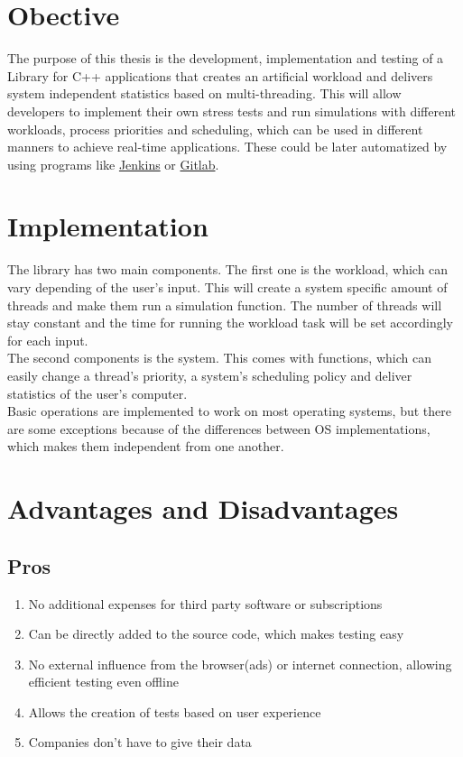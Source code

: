 \section{Obective}
The purpose of this thesis is the development, implementation and testing of a Library for C++ applications that creates an artificial workload and delivers system independent statistics based on multi-threading. This will allow developers to implement their own stress tests and run simulations with different workloads, process priorities and scheduling, which can be used in different manners to achieve real-time applications. These could be later automatized by using programs like \href{https://www.jenkins.io/}{Jenkins}\cite{Jenkins} or \href{https://about.gitlab.com/}{Gitlab}\cite{GitLab}.

\section{Implementation}
The library has two main components. The first one is the workload, which can vary depending of the user's input. This will create a system specific amount of threads and make them run a simulation function. The number of threads will stay constant and the time for running the workload task will be set accordingly for each input.\\
The second components is the system. This comes with functions, which can easily change a thread's priority, a system's scheduling policy and deliver statistics of the user's computer.\\
Basic operations are implemented to work on most operating systems, but there are some exceptions because of the differences between OS implementations, which makes them independent from one another.
\section{Advantages and Disadvantages}
\subsection{Pros}
\begin{enumerate}
	\item No additional expenses for third party software or subscriptions
	\item Can be directly added to the source code, which makes testing easy
	\item No external influence from the browser(ads) or internet connection, allowing efficient testing even offline
	\item Allows the creation of tests based on user experience 
	\item Companies don't have to give their data 
\end{enumerate}

